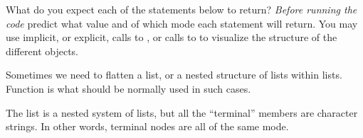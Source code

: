 \documentclass[krantz2]{krantz}\usepackage{knitr}%
\begin{document}
\begin{playground}
What do you expect each of the statements below to return? \emph{Before running the code} predict what value and of which mode each statement will return. You may use implicit, or explicit, calls to , or calls to  to visualize the structure of the different objects.

\begin{knitrout}\footnotesize
{}\color{fgcolor}\begin{kframe}
\begin{alltt}
 \hlkwb{<-} \hlstd{(} \hlstd{=} \hlstd{(}\hlstd{,} \hlstd{,} \hlstd{),}  \hlstd{=} \hlstd{(}\hlstd{,} \hlstd{))}
\hlstd{nested.list[}\hlopt{:}\hlstd{]}
\end{alltt}
\end{kframe}
\end{knitrout}

\begin{knitrout}\footnotesize
{}\color{fgcolor}\begin{kframe}
\begin{alltt}
\hlstd{nested.list[}\hlstd{]}
\hlstd{nested.list[[}\hlstd{]][}\hlstd{]}
\hlstd{nested.list[[}\hlstd{]][[}\hlstd{]]}
\hlstd{nested.list[}\hlstd{]}
\hlstd{nested.list[}\hlstd{][[}\hlstd{]]}
\end{alltt}
\end{kframe}
\end{knitrout}

\end{playground}

Sometimes we need to flatten a list, or a nested structure of lists within lists. Function  is what should be normally used in such cases.

The list  is a nested system of lists, but all the ``terminal'' members are character strings. In other words, terminal nodes are all of the same mode.
\end{document}

